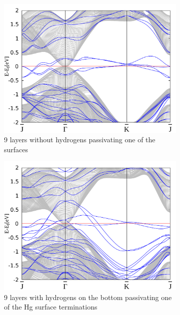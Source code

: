 \begin{figure}[htbp]
\begin{subfigure}[c]{.48\linewidth}
			\centering
			\includegraphics[width=\linewidth]{Hg_termination/no_H_bulk+9_layers_no_dos_-2_2.pdf}
			\caption{9 layers without hydrogens passivating one of the surfaces}
		\end{subfigure}
		\hfill
		\begin{subfigure}[c]{.48\linewidth}
			\centering
			\includegraphics[width=\linewidth]{Hg_termination/bulk+9_layers_no_dos_-2_2.pdf}
			\caption{9 layers with hydrogens on the bottom passivating one of the Hg surface terminations}
		\end{subfigure}
		\begin{subfigure}[c]{.48\linewidth}
			\centering 

\end{subfigure}
\end{figure}
